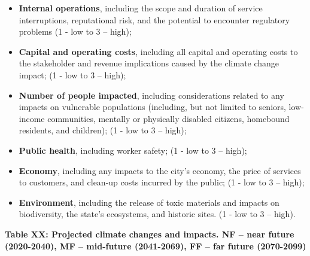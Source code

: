 \documentclass[
]{book}
\begin{document}
\begin{itemize}
\item
  \textbf{Internal operations}, including the scope and duration of service interruptions, reputational risk, and the potential to encounter regulatory problems (1 - low to 3 -- high);
\item
  \textbf{Capital and operating costs}, including all capital and operating costs to the stakeholder and revenue implications caused by the climate change impact; (1 - low to 3 -- high);
\item
  \textbf{Number of people impacted}, including considerations related to any impacts on vulnerable populations (including, but not limited to seniors, low-income communities, mentally or physically disabled citizens, homebound residents, and children); (1 - low to 3 -- high);
\item
  \textbf{Public health}, including worker safety; (1 - low to 3 -- high);
\item
  \textbf{Economy}, including any impacts to the city's economy, the price of services to customers, and clean-up costs incurred by the public; (1 - low to 3 -- high);
\item
  \textbf{Environment}, including the release of toxic materials and impacts on biodiversity, the state's ecosystems, and historic sites. (1 - low to 3 -- high).
\end{itemize}

\textbf{Table XX: Projected climate changes and impacts. NF -- near future (2020-2040), MF -- mid-future (2041-2069), FF -- far future (2070-2099)}
\end{document}
